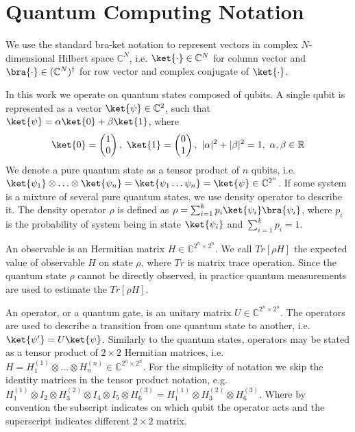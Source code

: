 \chapter{Quantum Computing Notation}\label{chapter:quantum_mechanic_introduction}
We use the standard bra-ket notation to represent vectors in complex
$N$-dimensional Hilbert space $\mathbb{C}^N$, i.e.
$\ket{\cdot} \in \mathbb{C}^N$ for column vector and $\bra{\cdot} \in
(\mathbb{C}^{N})^{\dagger}$ for row vector and complex conjugate of
$\ket{\cdot}$.

In this work we operate on quantum states composed of qubits. A single qubit is
represented as a vector $\ket{\psi} \in \mathbb{C}^2$, such that $\ket{\psi} =
\alpha\ket{0} + \beta\ket{1}$, where 
\begin{align*}
  \ket{0} = \begin{pmatrix}
    1 \\
    0 
  \end{pmatrix},\ 
  \ket{1} = \begin{pmatrix}
    0 \\
    1 
  \end{pmatrix},\ 
  |\alpha|^2 + |\beta|^2 = 1,\
  \alpha, \beta \in \mathbb{R}
\end{align*}
We denote a pure quantum state as a tensor product of $n$ qubits, i.e.
$\ket{\psi_1} \otimes \ldots \otimes \ket{\psi_n} = \ket{\psi_1 \ldots \psi_n} =
\ket{\psi} \in
\mathbb{C}^{2^n}$. 
If some system is a mixture of several pure quantum states, we use density
operator to describe it. The density operator $\rho$ is defined as $\rho =
\sum_{i=1}^{k}p_i\ket{\psi_i}\bra{\psi_i}$, where $p_i$ is the probability of
system being in state $\ket{\psi_i}$ and $\sum_{i=1}^kp_i = 1$.

An observable is an Hermitian matrix $H \in \mathbb{C}^{2^n \times 2^n}$. We
call $Tr[\rho H]$ the expected value of observable $H$ on state $\rho$, where
$Tr$ is matrix trace operation. Since the quantum state $\rho$ cannot be directly
observed, in practice quantum measurements \cite{10.5555/1972505} are used to
estimate the $Tr[\rho H]$.

An operator, or a quantum gate, is an unitary matrix $U \in \mathbb{C}^{2^n
  \times 2^n}$. The operators are used to describe a transition from one
quantum state to another, i.e. $\ket{\psi'} = U\ket{\psi}$.
Similarly to the quantum states, operators may be stated as a tensor
product of $2 \times 2$ Hermitian matrices, i.e. $H = H_1^{(1)} \otimes \ldots \otimes
H_n^{(n)} \in \mathbb{C}^{2^n \times 2^n}$. For the simplicity of notation we skip the
identity matrices in the tensor product notation, e.g. $H_1^{(1)} \otimes I_2 \otimes H_3^{(2)}
\otimes I_4 \otimes I_5 \otimes H_6^{(3)} = H_1^{(1)} \otimes H_3^{(2)} \otimes
H_6^{(3)}$. Where by convention the subscript indicates on which qubit the
operator acts and the superscript indicates different $2\times 2$ matrix.

